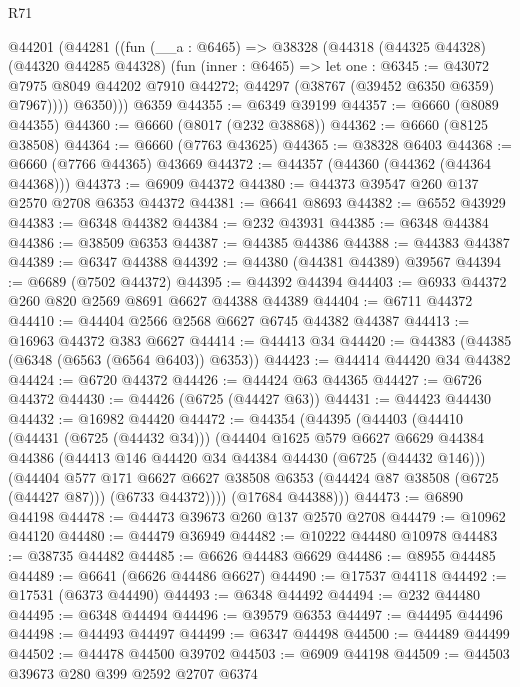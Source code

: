 \begin{lexlean}{R71}
\begin{coremodule}
    @44201
      (@44281
        ((fun (__a : @6465) =>
        @38328
          (@44318
            (@44325 @44328)
            (@44320 @44285 @44328)
            (fun (inner : @6465) =>
            let one : @6345 := @43072 @7975 @8049 @44202 @7910 @44272;
            @44297 (@38767 (@39452 @6350 @6359) @7967))))
          @6350)))
    @6359
@44355 := @6349 @39199
@44357 := @6660 (@8089 @44355)
@44360 := @6660 (@8017 (@232 @38868))
@44362 := @6660 (@8125 @38508)
@44364 := @6660 (@7763 @43625)
@44365 := @38328 @6403
@44368 := @6660 (@7766 @44365) @43669
@44372 := @44357 (@44360 (@44362 (@44364 @44368)))
@44373 := @6909 @44372
@44380 := @44373 @39547 @260 @137 @2570 @2708 @6353 @44372
@44381 := @6641 @8693
@44382 := @6552 @43929
@44383 := @6348 @44382
@44384 := @232 @43931
@44385 := @6348 @44384
@44386 := @38509 @6353
@44387 := @44385 @44386
@44388 := @44383 @44387
@44389 := @6347 @44388
@44392 := @44380 (@44381 @44389) @39567
@44394 := @6689 (@7502 @44372)
@44395 := @44392 @44394
@44403 := @6933 @44372 @260 @820 @2569 @8691 @6627 @44388 @44389
@44404 := @6711 @44372
@44410 := @44404 @2566 @2568 @6627 @6745 @44382 @44387
@44413 := @16963 @44372 @383 @6627
@44414 := @44413 @34
@44420 := @44383 (@44385 (@6348 (@6563 (@6564 @6403)) @6353))
@44423 := @44414 @44420 @34 @44382
@44424 := @6720 @44372
@44426 := @44424 @63 @44365
@44427 := @6726 @44372
@44430 := @44426 (@6725 (@44427 @63))
@44431 := @44423 @44430
@44432 := @16982 @44420
@44472 := @44354
    (@44395
      (@44403
        (@44410
          (@44431 (@6725 (@44432 @34)))
          (@44404
            @1625
            @579
            @6627
            @6629
            @44384
            @44386
            (@44413 @146 @44420 @34 @44384 @44430 (@6725 (@44432 @146)))
            (@44404
              @577
              @171
              @6627
              @6627
              @38508
              @6353
              (@44424 @87 @38508 (@6725 (@44427 @87)))
              (@6733 @44372))))
        (@17684 @44388)))
@44473 := @6890 @44198
@44478 := @44473 @39673 @260 @137 @2570 @2708
@44479 := @10962 @44120
@44480 := @44479 @36949
@44482 := @10222 @44480 @10978
@44483 := @38735 @44482
@44485 := @6626 @44483 @6629
@44486 := @8955 @44485
@44489 := @6641 (@6626 @44486 @6627)
@44490 := @17537 @44118
@44492 := @17531 (@6373 @44490)
@44493 := @6348 @44492
@44494 := @232 @44480
@44495 := @6348 @44494
@44496 := @39579 @6353
@44497 := @44495 @44496
@44498 := @44493 @44497
@44499 := @6347 @44498
@44500 := @44489 @44499
@44502 := @44478 @44500 @39702
@44503 := @6909 @44198
@44509 := @44503 @39673 @280 @399 @2592 @2707 @6374

\end{coremodule}
\end{lexlean}
